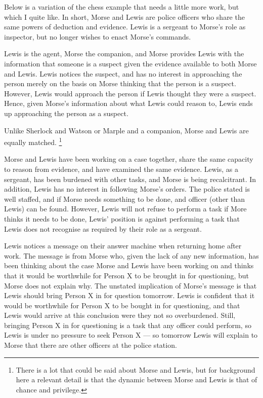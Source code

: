 \documentclass[10pt]{article}
\begin{document}
\begin{note}
  Below is a variation of the chess example that needs a little more work, but which I quite like.
  In short, Morse and Lewis are police officers who share the same powers of deduction and evidence.
  Lewis is a sergeant to Morse's role as inspector, but no longer wishes to enact Morse's commands.

  Lewis is the agent, Morse the companion, and Morse provides Lewis with the information that someone is a suspect given the evidence available to both Morse and Lewis.
  Lewis notices the suspect, and has no interest in approaching the person merely on the basis on Morse thinking that the person is a suspect.
  However, Lewis would approach the person if Lewis thought they were a suspect.
  Hence, given Morse's information about what Lewis could reason to, Lewis ends up approaching the person as a suspect.
\end{note}

Unlike Sherlock and Watson or Marple and a companion, Morse and Lewis are equally matched.\nolinebreak
\footnote{There is a lot that could be said about Morse and Lewis, but for background here a relevant detail is that the dynamic between Morse and Lewis is that of chance and privilege.}

Morse and Lewis have been working on a case together, share the same capacity to reason from evidence, and have examined the same evidence.
Lewis, as a sergeant, has been burdened with other tasks, and Morse is being recalcitrant.
In addition, Lewis has no interest in following Morse's orders.
The police stated is well staffed, and if Morse needs something to be done, and officer (other than Lewis) can be found.
However, Lewis will not refuse to perform a task if More thinks it needs to be done, Lewis' position is against performing a task that Lewis does not recognise as required by their role as a sergeant.

Lewis notices a message on their answer machine when returning home after work.
The message is from Morse who, given the lack of any new information, has been thinking about the case Morse and Lewis have been working on and thinks that it would be worthwhile for Person X to be brought in for questioning, but Morse does not explain why.
The unstated implication of Morse's message is that Lewis should bring Person X in for question tomorrow.
Lewis is confident that it would be worthwhile for Person X to be bought in for questioning, and that Lewis would arrive at this conclusion were they not so overburdened.
Still, bringing Person X in for questioning is a task that any officer could perform, so Lewis is under no pressure to seek Person X --- so tomorrow Lewis will explain to Morse that there are other officers at the police station.
\end{document}
